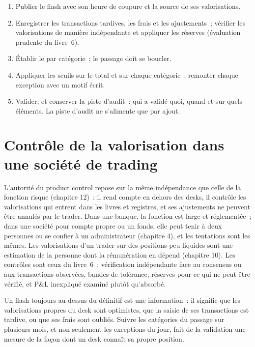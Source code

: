 \begin{method}\label{met:fm:finance-product-control-and-tax:sign}
\begin{enumerate}
\item Publier le flash avec son heure de coupure et la source de ses valorisations.
\item Enregistrer les transactions tardives, les frais et les ajustements~; vérifier les valorisations de manière indépendante et appliquer les réserves (évaluation prudente du livre~6).
\item Établir le  par catégorie~; le passage doit se boucler.
\item Appliquer les seuils sur le total et sur chaque catégorie~; remonter chaque exception avec un motif écrit.
\item Valider, et conserver la piste d'audit~: qui a validé quoi, quand et sur quels éléments. La piste d'audit ne s'alimente que par ajout.
\end{enumerate}
\end{method}

\section{Contrôle de la valorisation dans une société de trading}

L'autorité du product control repose sur la même indépendance que celle de la fonction risque (chapitre 12)~: il rend compte en dehors des desks, il contrôle les valorisations
qui entrent dans les livres et registres, et ses ajustements ne peuvent être annulés par le trader. Dans une banque, la fonction est large et réglementée~; dans une
société pour compte propre ou un fonds, elle peut tenir à deux personnes ou se confier à un administrateur (chapitre 4), et les tentations sont les mêmes. Les valorisations d'un trader sur
des positions peu liquides sont une estimation de la personne dont la rémunération en dépend (chapitre 10). Les contrôles sont ceux du livre~6~: vérification indépendante face au
consensus ou aux transactions observées, bandes de tolérance, réserves pour ce qui ne peut être vérifié, et P\&L inexpliqué examiné plutôt qu'absorbé.

\begin{remark}\label{rem:fm:finance-product-control-and-tax:flash}
Un flash toujours au-dessus du définitif est une information~: il signifie que les valorisations propres du desk sont optimistes, que la saisie de ses transactions est tardive, ou que ses frais sont
oubliés. Suivre les catégories du passage sur plusieurs mois, et non seulement les exceptions du jour, fait de la validation une mesure de la façon dont un desk
connaît sa propre position.
\end{remark}

